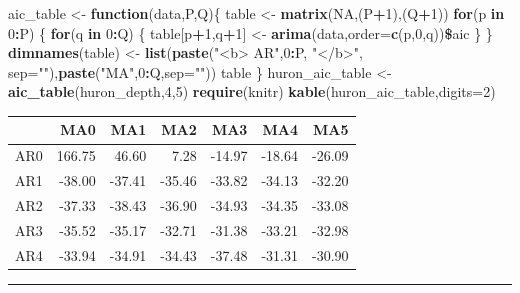 \documentclass[]{article}
\newenvironment{Shaded}{\begin{snugshade}}{\end{snugshade}}
\newcommand{\KeywordTok}[1]{\textcolor[rgb]{0.13,0.29,0.53}{\textbf{#1}}}
\newcommand{\DataTypeTok}[1]{\textcolor[rgb]{0.13,0.29,0.53}{#1}}
\newcommand{\DecValTok}[1]{\textcolor[rgb]{0.00,0.00,0.81}{#1}}
\newcommand{\StringTok}[1]{\textcolor[rgb]{0.31,0.60,0.02}{#1}}
\newcommand{\OtherTok}[1]{\textcolor[rgb]{0.56,0.35,0.01}{#1}}
\newcommand{\ControlFlowTok}[1]{\textcolor[rgb]{0.13,0.29,0.53}{\textbf{#1}}}
\newcommand{\OperatorTok}[1]{\textcolor[rgb]{0.81,0.36,0.00}{\textbf{#1}}}
\newcommand{\NormalTok}[1]{#1}
\begin{document}
\begin{Shaded}
\begin{Highlighting}[]
\NormalTok{aic_table <-}\StringTok{ }\ControlFlowTok{function}\NormalTok{(data,P,Q)\{}
\NormalTok{  table <-}\StringTok{ }\KeywordTok{matrix}\NormalTok{(}\OtherTok{NA}\NormalTok{,(P}\OperatorTok{+}\DecValTok{1}\NormalTok{),(Q}\OperatorTok{+}\DecValTok{1}\NormalTok{))}
  \ControlFlowTok{for}\NormalTok{(p }\ControlFlowTok{in} \DecValTok{0}\OperatorTok{:}\NormalTok{P) \{}
    \ControlFlowTok{for}\NormalTok{(q }\ControlFlowTok{in} \DecValTok{0}\OperatorTok{:}\NormalTok{Q) \{}
\NormalTok{       table[p}\OperatorTok{+}\DecValTok{1}\NormalTok{,q}\OperatorTok{+}\DecValTok{1}\NormalTok{] <-}\StringTok{ }\KeywordTok{arima}\NormalTok{(data,}\DataTypeTok{order=}\KeywordTok{c}\NormalTok{(p,}\DecValTok{0}\NormalTok{,q))}\OperatorTok{\$}\NormalTok{aic}
\NormalTok{    \}}
\NormalTok{  \}}
  \KeywordTok{dimnames}\NormalTok{(table) <-}\StringTok{ }\KeywordTok{list}\NormalTok{(}\KeywordTok{paste}\NormalTok{(}\StringTok{"<b> AR"}\NormalTok{,}\DecValTok{0}\OperatorTok{:}\NormalTok{P, }\StringTok{"</b>"}\NormalTok{, }\DataTypeTok{sep=}\StringTok{""}\NormalTok{),}\KeywordTok{paste}\NormalTok{(}\StringTok{"MA"}\NormalTok{,}\DecValTok{0}\OperatorTok{:}\NormalTok{Q,}\DataTypeTok{sep=}\StringTok{""}\NormalTok{))}
\NormalTok{  table}
\NormalTok{\}}
\NormalTok{huron_aic_table <-}\StringTok{ }\KeywordTok{aic_table}\NormalTok{(huron_depth,}\DecValTok{4}\NormalTok{,}\DecValTok{5}\NormalTok{)}
\KeywordTok{require}\NormalTok{(knitr)}
\KeywordTok{kable}\NormalTok{(huron_aic_table,}\DataTypeTok{digits=}\DecValTok{2}\NormalTok{)}
\end{Highlighting}
\end{Shaded}

\begin{longtable}[]{@{}lrrrrrr@{}}
\toprule
& MA0 & MA1 & MA2 & MA3 & MA4 & MA5\tabularnewline
\midrule
\endhead
 AR0 & 166.75 & 46.60 & 7.28 & -14.97 & -18.64 & -26.09\tabularnewline
 AR1 & -38.00 & -37.41 & -35.46 & -33.82 & -34.13 &
-32.20\tabularnewline
 AR2 & -37.33 & -38.43 & -36.90 & -34.93 & -34.35 &
-33.08\tabularnewline
 AR3 & -35.52 & -35.17 & -32.71 & -31.38 & -33.21 &
-32.98\tabularnewline
 AR4 & -33.94 & -34.91 & -34.43 & -37.48 & -31.31 &
-30.90\tabularnewline
\bottomrule
\end{longtable}

\begin{center}\rule{0.5\linewidth}{\linethickness}\end{center}
\end{document}

